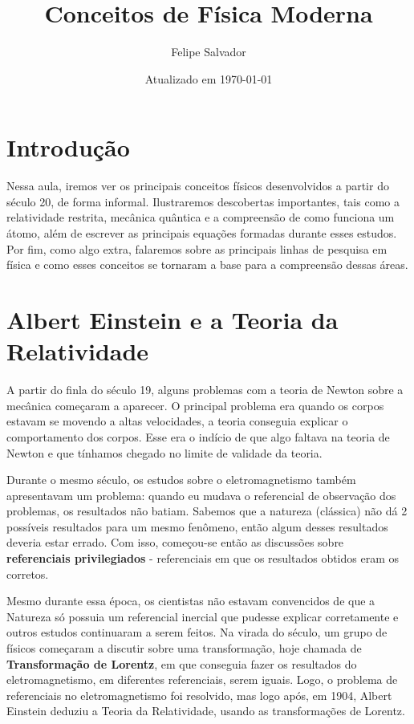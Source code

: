 \documentclass[12pt]{extarticle}
\title{Conceitos de Física Moderna}
\author{Felipe Salvador}
\date{Atualizado em \today}
\newcommand{\<}{\langle}
\renewcommand{\>}{\rangle}
\theoremstyle{definition}
\begin{document}
\maketitle

\section{Introdução}
Nessa aula, iremos ver os principais conceitos físicos desenvolvidos a partir do século 20, de forma informal. Ilustraremos descobertas importantes, tais como a relatividade restrita, mecânica quântica e a compreensão de como funciona um átomo, além de escrever as principais equações formadas durante esses estudos. Por fim, como algo extra, falaremos sobre as principais linhas de pesquisa em física e como esses conceitos se tornaram a base para a compreensão dessas áreas.

\section{Albert Einstein e a Teoria da Relatividade}
A partir do finla do século 19, alguns problemas com a teoria de Newton sobre a mecânica começaram a aparecer. O principal problema era quando os corpos estavam se movendo a altas velocidades, a teoria conseguia explicar o comportamento dos corpos. Esse era o indício de que algo faltava na teoria de Newton e que tínhamos chegado no limite de validade da teoria.

Durante o mesmo século, os estudos sobre o eletromagnetismo também apresentavam um problema: quando eu mudava o referencial de observação dos problemas, os resultados não batiam. Sabemos que a natureza (clássica) não dá 2 possíveis resultados para um mesmo fenômeno, então algum desses resultados deveria estar errado. Com isso, começou-se então as discussões sobre \textbf{referenciais privilegiados} - referenciais em que os resultados obtidos eram os corretos.

Mesmo durante essa época, os cientistas não estavam convencidos de que a Natureza só possuia um referencial inercial que pudesse explicar corretamente e outros estudos continuaram a serem feitos. Na virada do século, um grupo de físicos começaram a discutir sobre uma transformação, hoje chamada de \textbf{Transformação de Lorentz}, em que  conseguia fazer os resultados do eletromagnetismo, em diferentes referenciais, serem iguais. Logo, o problema de referenciais no eletromagnetismo foi resolvido, mas logo após, em 1904, Albert Einstein deduziu a Teoria da Relatividade, usando as transformações de Lorentz.
\end{document}
